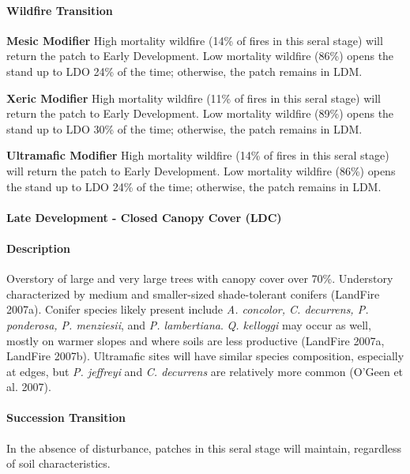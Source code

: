 \paragraph{Wildfire Transition}
\begin{adjustwidth}{2cm}{}
\textbf{Mesic Modifier } High mortality wildfire (14\% of fires in this seral stage) will return the patch to Early Development. Low mortality wildfire (86\%) opens the stand up to LDO 24\% of the time; otherwise, the patch remains in LDM.

\medskip
\noindent \textbf{Xeric Modifier} High mortality wildfire (11\% of fires in this seral stage) will return the patch to Early Development. Low mortality wildfire (89\%) opens the stand up to LDO 30\% of the time; otherwise, the patch remains in LDM. 

\medskip
\noindent \textbf{Ultramafic Modifier} High mortality wildfire (14\% of fires in this seral stage) will return the patch to Early Development. Low mortality wildfire (86\%) opens the stand up to LDO 24\% of the time; otherwise, the patch remains in LDM.

\end{adjustwidth}

\noindent\hrulefill

\paragraph{Late Development - Closed Canopy Cover (LDC)}

\paragraph{Description} Overstory of large and very large trees with canopy cover over 70\%. Understory characterized by medium and smaller-sized shade-tolerant conifers (LandFire 2007a). Conifer species likely present include \emph{A. concolor, C. decurrens, P. ponderosa, P. menziesii}, and \emph{P. lambertiana}. \emph{Q. kelloggi} may occur as well, mostly on warmer slopes and where soils are less productive (LandFire 2007a, LandFire 2007b). Ultramafic sites will have similar species composition, especially at edges, but \emph{P. jeffreyi} and \emph{C. decurrens} are relatively more common (O'Geen et al. 2007).

\paragraph{Succession Transition} In the absence of disturbance, patches in this seral stage will maintain, regardless of soil characteristics.

